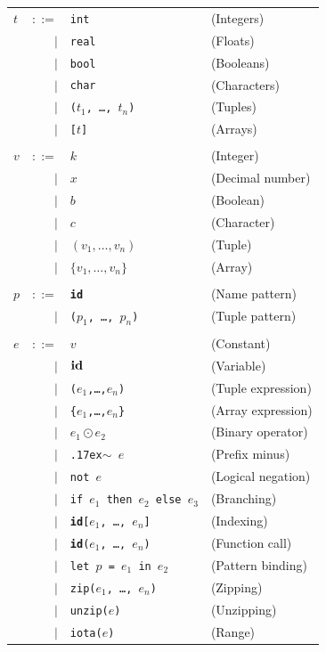 \documentclass{sigplanconf}  %
\renewcommand\tilde[0]{{\raise.17ex\hbox{$\scriptstyle\sim$}}}
\begin{document}
\begin{figure}[bt]
\begin{tabular}{lrll}
$t$ & $::=$ & {\tt int} & (Integers) \\
& $|$ & {\tt real} & (Floats) \\
& $|$ & {\tt bool} & (Booleans) \\
& $|$ & {\tt char} & (Characters) \\
& $|$ & {\tt ($t_{1}$, \ldots, $t_{n}$)} & (Tuples) \\
& $|$ & {\tt [$t$]} & (Arrays) \\
\\
$v$ & $::=$ & $k$ & (Integer)\\
& $|$ & $x$ & (Decimal number) \\
& $|$ & $b$ & (Boolean)\\
& $|$ & $c$ & (Character)\\
& $|$ & $(v_{1},\ldots,v_{n})$ & (Tuple) \\
& $|$ & $\{v_{1},\ldots,v_{n}\}$ & (Array) \\
\\
$p$ & $::=$ & {\tt {\bf id}} & (Name pattern)\\
& $|$ & {\tt ($p_{1}$, \ldots, $p_{n}$)} & (Tuple pattern) \\
\\
$e$ & $::=$ & $v$ & (Constant)\\
& $|$ & ${\bf id}$ & (Variable)\\
& $|$ & {\tt ($e_{1}$,\ldots,$e_{n}$)} & (Tuple expression) \\
& $|$ & {\tt \{$e_{1}$,\ldots,$e_{n}$\}} & (Array expression) \\
& $|$ & $e_{1} \odot{} e_{2}$ & (Binary operator) \\
& $|$ & {\tt \tilde{} $e$} & (Prefix minus) \\
& $|$ & {\tt not $e$} & (Logical negation) \\
& $|$ & {\tt if $e_{1}$ then $e_{2}$ else $e_{3}$} & (Branching) \\
& $|$ & {\tt {\bf id}[$e_{1}$, \ldots, $e_{n}$]} & (Indexing) \\
& $|$ & {\tt {\bf id}($e_{1}$, \ldots, $e_{n}$)} & (Function call) \\
& $|$ & {\tt let $p$ = $e_{1}$ in $e_{2}$} & (Pattern binding) \\
& $|$ & {\tt zip($e_{1}$, \ldots, $e_{n}$)} & (Zipping) \\
& $|$ & {\tt unzip($e$)} & (Unzipping) \\
& $|$ & {\tt iota($e$)} & (Range) \\

\end{tabular}
\end{figure}
\end{document}
